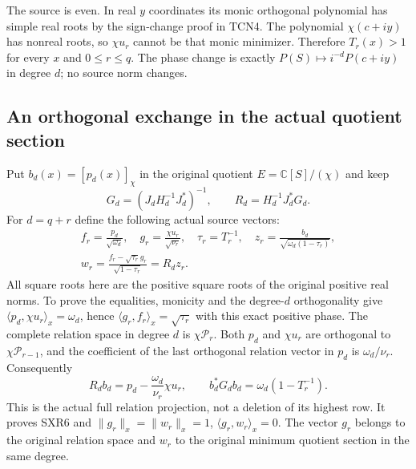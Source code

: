 \documentclass[11pt,a4paper]{article}
\begin{document}
The source is even. In real $y$ coordinates its monic orthogonal
polynomial has simple real roots by the sign-change proof in TCN4.
The polynomial $\chi(c+iy)$ has nonreal roots, so $\chi u_r$ cannot
be that monic minimizer. Therefore $T_r(x)>1$ for every $x$ and
$0\le r\le q$. The phase change is exactly
$P(S)\mapsto i^{-d}P(c+iy)$ in degree $d$; no source norm changes.

\subsection{An orthogonal exchange in the actual quotient section}

Put $b_d(x)=[p_d(x)]_\chi$ in the original quotient
$E=\mathbb C[S]/(\chi)$ and keep
\[
 G_d=(J_dH_d^{-1}J_d^*)^{-1},\qquad R_d=H_d^{-1}J_d^*G_d.
\]
For $d=q+r$ define the following actual source vectors:
\begin{equation}\tag{SXR6}
\begin{gathered}
 f_r=\frac{p_d}{\sqrt{\omega_d}},\quad
 g_r=\frac{\chi u_r}{\sqrt{\nu_r}},\quad
 \tau_r=T_r^{-1},\quad
 z_r=\frac{b_d}{\sqrt{\omega_d(1-\tau_r)}},\\
 w_r=\frac{f_r-\sqrt{\tau_r}g_r}{\sqrt{1-\tau_r}}
           =R_d z_r.
\end{gathered}
\end{equation}
All square roots here are the positive square roots of the original
positive real norms. To prove the equalities, monicity and the
degree-$d$ orthogonality give
$\langle p_d,\chi u_r\rangle_x=\omega_d$, hence
$\langle g_r,f_r\rangle_x=\sqrt{\tau_r}$ with this exact positive
phase. The complete relation space in degree $d$ is
$\chi\mathcal P_r$. Both $p_d$ and $\chi u_r$ are orthogonal to
$\chi\mathcal P_{r-1}$, and the coefficient of the last orthogonal
relation vector in $p_d$ is $\omega_d/\nu_r$. Consequently
\begin{equation}\tag{SXR7}
 R_db_d=p_d-\frac{\omega_d}{\nu_r}\chi u_r,
 \qquad b_d^*G_db_d=\omega_d(1-T_r^{-1}).
\end{equation}
This is the actual full relation projection, not a deletion of its
highest row. It proves SXR6 and
$\|g_r\|_x=\|w_r\|_x=1$, $\langle g_r,w_r\rangle_x=0$.
The vector $g_r$ belongs to the original relation space and $w_r$
to the original minimum quotient section in the same degree.
\end{document}
